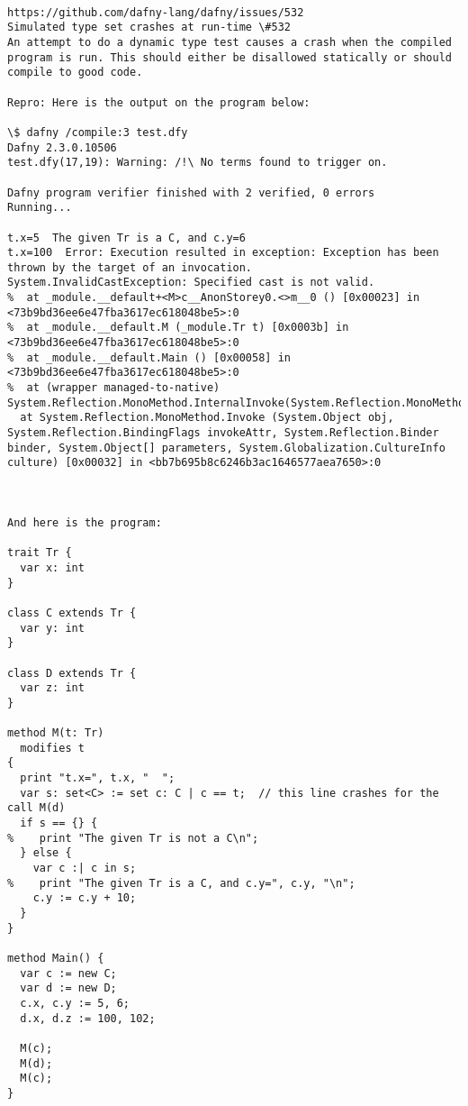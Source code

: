 \documentclass[12pt,openany,a4paper]{book}
\begin{document}
\begin{verbatim}

https://github.com/dafny-lang/dafny/issues/532
Simulated type set crashes at run-time \#532
An attempt to do a dynamic type test causes a crash when the compiled program is run. This should either be disallowed statically or should compile to good code.

Repro: Here is the output on the program below:

\$ dafny /compile:3 test.dfy
Dafny 2.3.0.10506
test.dfy(17,19): Warning: /!\ No terms found to trigger on.

Dafny program verifier finished with 2 verified, 0 errors
Running...

t.x=5  The given Tr is a C, and c.y=6
t.x=100  Error: Execution resulted in exception: Exception has been thrown by the target of an invocation.
System.InvalidCastException: Specified cast is not valid.
%  at _module.__default+<M>c__AnonStorey0.<>m__0 () [0x00023] in <73b9bd36ee6e47fba3617ec618048be5>:0
%  at _module.__default.M (_module.Tr t) [0x0003b] in <73b9bd36ee6e47fba3617ec618048be5>:0
%  at _module.__default.Main () [0x00058] in <73b9bd36ee6e47fba3617ec618048be5>:0
%  at (wrapper managed-to-native) System.Reflection.MonoMethod.InternalInvoke(System.Reflection.MonoMethod,object,object[],System.Exception&)
  at System.Reflection.MonoMethod.Invoke (System.Object obj, System.Reflection.BindingFlags invokeAttr, System.Reflection.Binder binder, System.Object[] parameters, System.Globalization.CultureInfo culture) [0x00032] in <bb7b695b8c6246b3ac1646577aea7650>:0



And here is the program:

trait Tr {
  var x: int
}

class C extends Tr {
  var y: int
}

class D extends Tr {
  var z: int
}

method M(t: Tr)
  modifies t
{
  print "t.x=", t.x, "  ";
  var s: set<C> := set c: C | c == t;  // this line crashes for the call M(d)
  if s == {} {
%    print "The given Tr is not a C\n";
  } else {
    var c :| c in s;
%    print "The given Tr is a C, and c.y=", c.y, "\n";
    c.y := c.y + 10;
  }
}

method Main() {
  var c := new C;
  var d := new D;
  c.x, c.y := 5, 6;
  d.x, d.z := 100, 102;

  M(c);
  M(d);
  M(c);
}

\end{verbatim}
\end{document}
